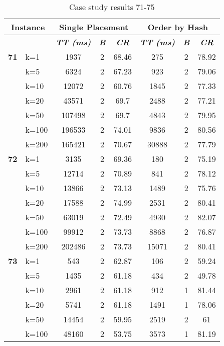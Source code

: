     \begin{table}[htbp]
    \caption{Case study results 71-75}
    \centering
    \begin{tabular}{|l|l|c|c|c|c|c|c|}
    \hline
    \multicolumn{ 2}{|c|}{\textbf{Instance}} & \multicolumn{ 3}{c|}{\textbf{Single Placement}} & \multicolumn{ 3}{c|}{\textbf{Order by Hash}} \\ \hline
    \multicolumn{ 2}{|l|}{} & \textbf{\textit{TT (ms)}} & \textbf{\textit{B}} & \textbf{\textit{CR}} & \textbf{\textit{TT (ms)}} & \textbf{\textit{B}} & \textbf{\textit{CR}} \\ \hline
    \multicolumn{1}{|r|}{\textbf{71}} & k=1 & 1937 & 2 & 68.46 & 275 & 2 & 78.92 \\ 
     & k=5 & 6324 & 2 & 67.23 & 923 & 2 & 79.06 \\ 
     & k=10 & 12072 & 2 & 60.76 & 1845 & 2 & 77.33 \\ 
     & k=20 & 43571 & 2 & 69.7 & 2488 & 2 & 77.21 \\ 
     & k=50 & 107498 & 2 & 69.7 & 4843 & 2 & 79.95 \\ 
     & k=100 & 196533 & 2 & 74.01 & 9836 & 2 & 80.56 \\ 
     & k=200 & 165421 & 2 & 70.67 & 30888 & 2 & 77.79 \\ \hline
    \multicolumn{1}{|r|}{\textbf{72}} & k=1 & 3135 & 2 & 69.36 & 180 & 2 & 75.19 \\ 
     & k=5 & 12714 & 2 & 70.89 & 841 & 2 & 78.12 \\ 
     & k=10 & 13866 & 2 & 73.13 & 1489 & 2 & 75.76 \\ 
     & k=20 & 17588 & 2 & 74.99 & 2531 & 2 & 80.41 \\ 
     & k=50 & 63019 & 2 & 72.49 & 4930 & 2 & 82.07 \\ 
     & k=100 & 99912 & 2 & 73.73 & 8868 & 2 & 76.87 \\ 
     & k=200 & 202486 & 2 & 73.73 & 15071 & 2 & 80.41 \\ \hline
    \multicolumn{1}{|r|}{\textbf{73}} & k=1 & 543 & 2 & 62.87 & 106 & 2 & 59.24 \\ 
     & k=5 & 1435 & 2 & 61.18 & 434 & 2 & 49.78 \\ 
     & k=10 & 2961 & 2 & 61.18 & 912 & 1 & 81.44 \\ 
     & k=20 & 5741 & 2 & 61.18 & 1491 & 1 & 78.06 \\ 
     & k=50 & 14454 & 2 & 59.95 & 2519 & 2 & 61 \\ 
     & k=100 & 48160 & 2 & 53.75 & 3573 & 1 & 81.19 \\ 

\end{tabular}
\end{table}
